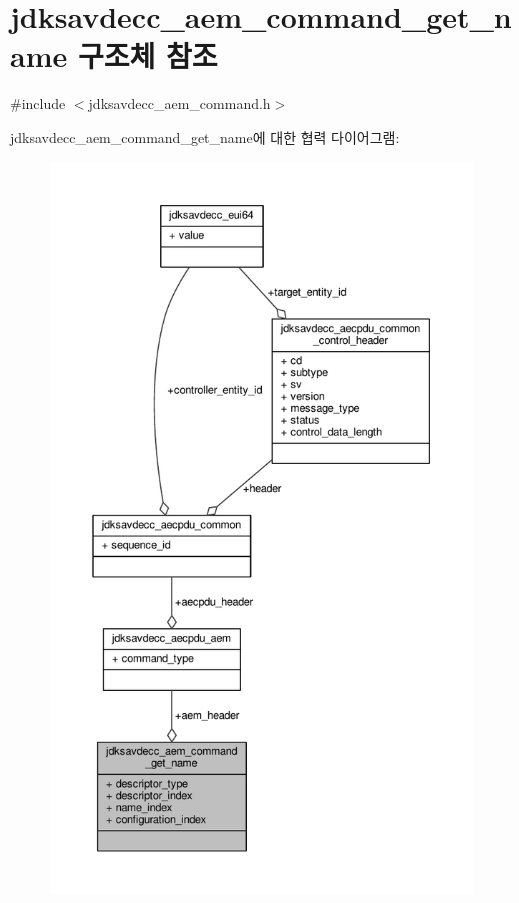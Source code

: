 \hypertarget{structjdksavdecc__aem__command__get__name}{}\section{jdksavdecc\+\_\+aem\+\_\+command\+\_\+get\+\_\+name 구조체 참조}
\label{structjdksavdecc__aem__command__get__name}


{\ttfamily \#include $<$jdksavdecc\+\_\+aem\+\_\+command.\+h$>$}



jdksavdecc\+\_\+aem\+\_\+command\+\_\+get\+\_\+name에 대한 협력 다이어그램\+:
\nopagebreak
\begin{figure}[H]
\begin{center}
\leavevmode
\includegraphics[height=550pt]{structjdksavdecc__aem__command__get__name__coll__graph}
\end{center}
\end{figure}
